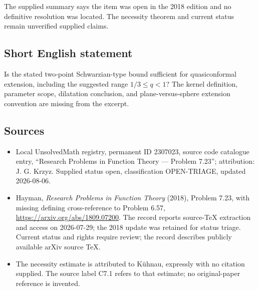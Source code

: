 \documentclass[11pt]{article}
\begin{document}
The supplied summary says the item was open in the 2018 edition and no definitive resolution was located. The necessity theorem and current status remain unverified supplied claims.
\subsection{Short English statement}
Is the stated two-point Schwarzian-type bound sufficient for quasiconformal extension, including the suggested range $1/3\leq q<1$? The kernel definition, parameter scope, dilatation conclusion, and plane-versus-sphere extension convention are missing from the excerpt.
\subsection{Sources}
\begin{itemize}
\item Local UnsolvedMath registry, permanent ID 2307023, source code catalogue entry, ``Research Problems in Function Theory --- Problem 7.23''; attribution: J. G. Krzyz. Supplied status open, classification OPEN-TRIAGE, updated 2026-08-06.
\item Hayman, \emph{Research Problems in Function Theory} (2018), Problem 7.23, with missing defining cross-reference to Problem 6.57, \url{https://arxiv.org/abs/1809.07200}. The record reports source-TeX extraction and access on 2026-07-29; the 2018 update was retained for status triage. Current status and rights require review; the record describes publicly available arXiv source TeX.
\item The necessity estimate is attributed to K\"uhnau, expressly with no citation supplied. The source label C7.1 refers to that estimate; no original-paper reference is invented.
\end{itemize}
\end{document}
